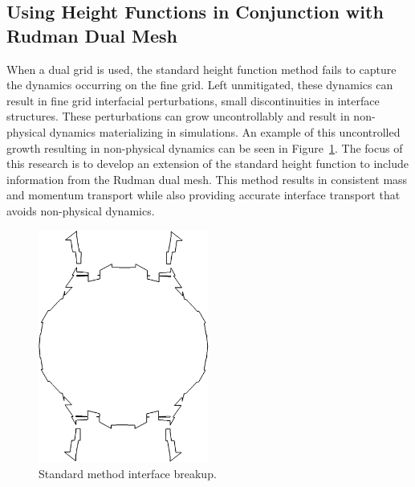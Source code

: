 \subsection{Using Height Functions in Conjunction with Rudman Dual Mesh }
When a dual grid is used, the standard height function method fails to capture the dynamics occurring on the fine grid. Left unmitigated, these dynamics can result in fine grid interfacial perturbations, small discontinuities in interface structures. These perturbations can grow uncontrollably and result in non-physical dynamics materializing in simulations. An example of this uncontrolled growth resulting in non-physical dynamics can be seen in Figure~\ref{bad2}. The focus of this research is to develop an extension of the standard height function to include information from the Rudman dual mesh. This method results in consistent mass and momentum transport while also providing accurate interface transport that avoids non-physical dynamics.
\begin{figure}[h!]
	\centering
		\includegraphics[width=0.5\textwidth]{figs/bad.png}
	\caption{Standard method interface breakup.}
	\label{bad2} 
\end{figure} 

